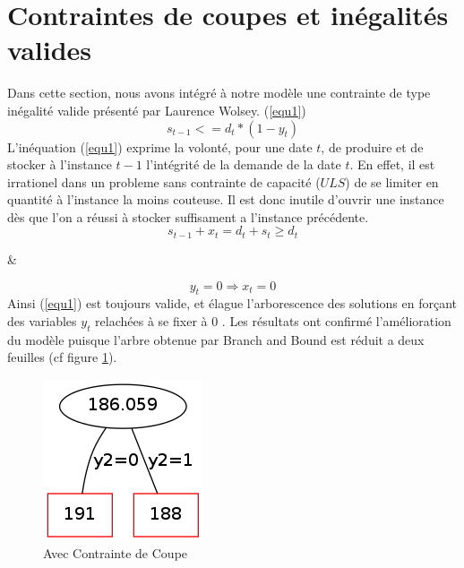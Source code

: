 \documentclass[a4paper,11pt,twoside]{report}
\begin{document}
\section{Contraintes de coupes et inégalités valides}
Dans cette section, nous avons intégré à notre modèle une contrainte de type inégalité valide présenté par Laurence Wolsey. (\ref{equ1})
\begin{equation}
s_{t-1} <= d_{t}*(1-y_{t}) \label{equ1}
\end{equation}
L'inéquation (\ref{equ1}) exprime la volonté, pour une date $t$, de produire et de stocker à l'instance $t-1$ l'intégrité de la demande de la date $t$.
En effet, il est irrationel dans un probleme sans contrainte de capacité ($ULS$) de se limiter en quantité à l'instance la moins couteuse.
Il est donc inutile d'ouvrir une instance dès que l'on a réussi à stocker suffisament a l'instance précédente.
\begin{equation}
s_{t-1}+x_{t} = d_{t}+s_{t} \geq d_{t}
\end{equation}
\begin{center}\&\end{center}
\begin{equation}
y_{t}=0 \Rightarrow x_{t}=0
\end{equation}
Ainsi (\ref{equ1}) est toujours valide, et élague l'arborescence des solutions en forçant des variables $y_{t}$ relachées à se fixer à 0 .
Les résultats ont confirmé l'amélioration du modèle puisque l'arbre obtenue par Branch and Bound est réduit a deux feuilles (cf figure \ref{graph3}).
\begin{figure}[h]
 \centering
 \includegraphics[width=\textwidth/4]{graph3.png}
 \caption{Avec Contrainte de Coupe}
 \label{graph3}
\end{figure}
\end{document}
